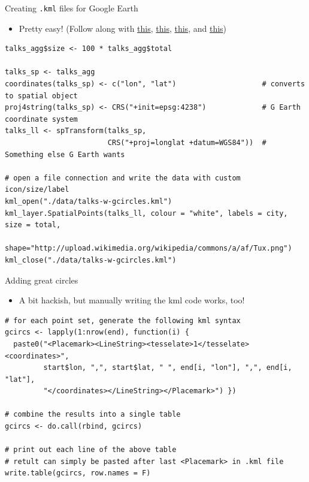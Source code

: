 \documentclass[sans,aspectratio=169,presentation,bigger,fleqn]{beamer}
\begin{document}
\begin{frame}[fragile,label=sec-22]{Creating \texttt{.kml} files for Google Earth}
 \begin{itemize}
\item Pretty easy! (Follow along with \href{http://www.nceas.ucsb.edu/scicomp/usecases/shapeFileToKML}{this}, \href{http://stackoverflow.com/questions/7813141/how-to-create-a-kml-file-using-r}{this}, \href{http://stackoverflow.com/questions/21487010/assistance-with-name-and-styleurl-in-kml-when-using-writeogr-from-rgdal}{this}, and \href{http://gsif.isric.org/doku.php?id=wiki:tutorial_plotkml}{this})
\end{itemize}

\scriptsize
\begin{verbatim}
talks_agg$size <- 100 * talks_agg$total

talks_sp <- talks_agg
coordinates(talks_sp) <- c("lon", "lat")                    # converts to spatial object
proj4string(talks_sp) <- CRS("+init=epsg:4238")             # G Earth coordinate system
talks_ll <- spTransform(talks_sp,
                        CRS("+proj=longlat +datum=WGS84"))  # Something else G Earth wants

# open a file connection and write the data with custom icon/size/label
kml_open("./data/talks-w-gcircles.kml")
kml_layer.SpatialPoints(talks_ll, colour = "white", labels = city, size = total,
                        shape="http://upload.wikimedia.org/wikipedia/commons/a/af/Tux.png")
kml_close("./data/talks-w-gcircles.kml")
\end{verbatim}
\normalsize
\end{frame}
\begin{frame}[fragile,label=sec-23]{Adding great circles}
 \begin{itemize}
\item A bit hackish, but manually writing the kml code works, too!
\end{itemize}

\scriptsize
\begin{verbatim}
# for each point set, generate the following kml syntax
gcircs <- lapply(1:nrow(end), function(i) {
  paste0("<Placemark><LineString><tesselate>1</tesselate><coordinates>",
         start$lon, ",", start$lat, " ", end[i, "lon"], ",", end[i, "lat"],
         "</coordinates></LineString></Placemark>") })

# combine the results into a single table
gcircs <- do.call(rbind, gcircs)

# print out each line of the above table
# retult can simply be pasted after last <Placemark> in .kml file
write.table(gcircs, row.names = F)
\end{verbatim}
\normalsize
\end{frame}
\end{document}
